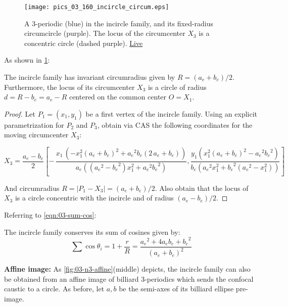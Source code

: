 \begin{figure}
    \centering
    \texttt{[image: pics\_03\_160\_incircle\_circum.eps]}
    \caption{A 3-periodic (blue) in the incircle family, and its fixed-radius circumcircle (purple). The locus of the circumcenter $X_3$ is a concentric circle (dashed purple). \href{https://bit.ly/3thddWK}{Live}}
    \label{fig:03-incircle-circum}
\end{figure}

As shown in \cref{fig:03-incircle-circum}:

\begin{proposition}
The incircle family has invariant circumradius given by $R=(a_e+b_e)/2$. Furthermore, the locus of its circumcenter $X_3$ is a circle of radius $d=R-b_e=a_e-R$ centered on the common center $O=X_1$.
\label{prop:n3-incircle-R}
\end{proposition}

\begin{proof}
Let $P_1=(x_1,y_1)$ be a first vertex of the incircle family. Using an explicit parametrization for $P_2$ and $P_3$, obtain via CAS the following coordinates for the moving circumcenter $X_3$:

{\scriptsize
\[
X_3=\frac{a_e-b_e}{2}\left[ - \,{\frac {x_1\, \left( -x_1^{2}
			\left( a_e+b_e \right) ^{2}+{a_e}^{2} b_e \left( 2\,a_e+b_e \right)  \right) }{ a_e
			\left(  \left( {a_e}^{2}-{b_e}^{2} \right) x_1^{2}+{a_e}^{2}{b_e}^{2}
			\right) }}
	 ,  {\frac { y_1\left( x_1^{2} \left( a_e+b_e
	 		\right) ^{2}-{a_e}^{2}{b_e}^{2} \right)}{b_e \left( {a_e}^{2}x_1^2+{b_e}^{2} \left( {a_e}^{2}-x_1^{2} \right)  \right) }}
	   \right]
 \]
 }

And circumradius $R=|P_1-X_3|=(a_e+b_e)/2$. Also obtain that the locus of $X_3$ is a circle concentric with the incircle and of radius $(a_e-b_e)/2$.
\end{proof}

Referring to \cref{eqn:03-sum-cos}: 

\begin{corollary}
The incircle family conserves its sum of cosines given by:
\[ \sum{\cos\theta_i}=1+\frac{r}{R}=\frac{{a_e}^2+4 {a_e}
   {b_e}+{b_e}^2}{({a_e}+{b_e})^2}\]
\label{cor:03-n3-inc-cos-sum}
\end{corollary}

\noindent \textbf{Affine image:} As \cref{fig:03-n3-affine}(middle) depicts, the incircle family can also be obtained from an affine image of billiard 3-periodics which sends the confocal caustic to a circle. As before, let $a,b$ be the semi-axes of its billiard ellipse pre-image.

